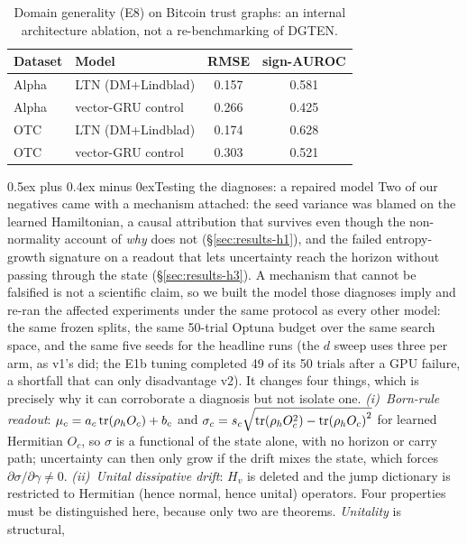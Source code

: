 \documentclass[journal]{IEEEtran}
\makeatletter
\def\subsection{\@startsection{subsection}{2}{\z@}{1.8ex plus 1ex minus 0.75ex}%
{0.5ex plus 0.4ex minus 0ex}{\normalfont\normalsize\itshape}}
\makeatother
\begin{document}
\begin{table}[t]\centering\caption{Domain generality (E8) on Bitcoin trust graphs:
an internal architecture ablation, not a re-benchmarking of DGTEN.}
\label{tab:e8}
\begin{tabular}{llcc}
\toprule
Dataset & Model & RMSE & sign-AUROC \\
\midrule
Alpha & LTN (DM+Lindblad) & 0.157 & 0.581 \\
Alpha & vector-GRU control & 0.266 & 0.425 \\
OTC & LTN (DM+Lindblad) & 0.174 & 0.628 \\
OTC & vector-GRU control & 0.303 & 0.521 \\
\bottomrule
\end{tabular}
\end{table}

\subsection{Testing the diagnoses: a repaired model}\label{sec:v2}
Two of our negatives came with a mechanism attached: the seed variance was blamed on
the learned Hamiltonian, a causal attribution that survives even though the
non-normality account of \emph{why} does not (\S\ref{sec:results-h1}), and the
failed entropy-growth signature on a readout that lets uncertainty reach the horizon
without passing through the state (\S\ref{sec:results-h3}). A mechanism that cannot
be falsified is not a scientific claim, so we built the model those diagnoses imply
and re-ran the
affected experiments under the same protocol as every other model: the same frozen
splits, the same 50-trial Optuna budget over the same search space, and the same five
seeds for the headline runs (the $d$ sweep uses three per arm, as v1's did; the E1b
tuning completed 49 of its 50 trials after a GPU failure, a shortfall that can only
disadvantage v2).
It changes four things, which is precisely why it can corroborate a diagnosis but
not isolate one.
\emph{(i)~Born-rule readout}: $\mu_c = a_c \tr(\rho_h O_c) + b_c$ and
$\sigma_c = s_c \sqrt{\tr(\rho_h O_c^2) - \tr(\rho_h O_c)^2}$ for learned Hermitian
$O_c$, so $\sigma$ is a functional of the state alone, with no horizon or carry path;
uncertainty can then only grow if the drift mixes the state, which forces
$\partial\sigma/\partial\gamma \neq 0$.
\emph{(ii)~Unital dissipative drift}: $H_v$ is deleted and the jump dictionary is
restricted to Hermitian (hence normal, hence unital) operators. Four properties must
be distinguished here, because only two are theorems. \emph{Unitality} is structural,
\end{document}
